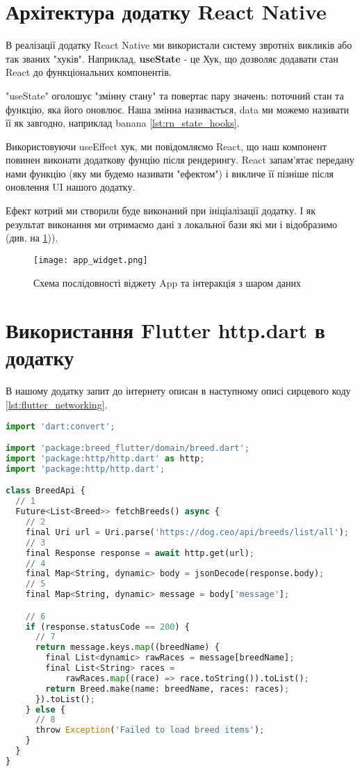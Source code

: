\section{Архітектура додатку React Native}
\label{section.2.2}
В реалізації додатку React Native ми використали систему звротніх викликів або так званих "хуків".
Наприклад, \textbf{useState} - це Хук, що дозволяє додавати стан React до функціональних компонентів.

"useState" оголошує "змінну стану" та повертає пару значень: поточний стан та функцію, яка його оновлює.
Наша змінна називається, data ми можемо називати її як завгодно, наприклад banana \ref{lst:rn_state_hooks}.

Використовуючи useEffect хук, ми повідомляємо React, що наш компонент повинен виконати додаткову фунцію після рендерингу.
React запам'ятає передану нами функцію (яку ми будемо називати "ефектом") і викличе її пізніше після оновлення UI нашого додатку.

Ефект котрий ми створили буде виконаний при ініціалізації додатку. І як результат виконання ми отримаємо дані з локальної бази які ми і відобразимо (див. на \ref{fig:rn_realm})).

\begin{figure}
    \begin{center}
        \texttt{[image: app\_widget.png]}
        \caption{Схема послідовності віджету App та інтеракція з шаром даних}
        \label{fig:rn_realm}
    \end{center}
\end{figure}


\section{Використання Flutter http.dart в додатку}
\label{section.2.3}
В нашому додатку запит до інтернету описан в наступному описі сирцевого коду \ref{lst:flutter_networking}.

\begin{lstlisting}[style=light, language=Python,label={lst:flutter_networking},caption=Flutter Networking]
import 'dart:convert';

import 'package:breed_flutter/domain/breed.dart';
import 'package:http/http.dart' as http;
import 'package:http/http.dart';

class BreedApi {
  // 1
  Future<List<Breed>> fetchBreeds() async {
    // 2
    final Uri url = Uri.parse('https://dog.ceo/api/breeds/list/all');
    // 3
    final Response response = await http.get(url);
    // 4
    final Map<String, dynamic> body = jsonDecode(response.body);
    // 5
    final Map<String, dynamic> message = body['message'];

    // 6
    if (response.statusCode == 200) {
      // 7
      return message.keys.map((breedName) {
        final List<dynamic> rawRaces = message[breedName];
        final List<String> races =
            rawRaces.map((race) => race.toString()).toList();
        return Breed.make(name: breedName, races: races);
      }).toList();
    } else {
      // 8
      throw Exception('Failed to load breed items');
    }
  }
}
\end{lstlisting}

